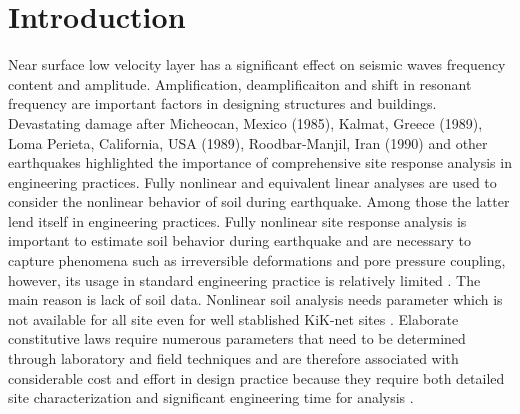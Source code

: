 
\section{Introduction}

Near surface low velocity layer has a significant effect on seismic waves frequency content and amplitude. Amplification, deamplificaiton and shift in resonant frequency are important factors in designing structures and buildings. Devastating damage after Micheocan, Mexico (1985), Kalmat, Greece (1989), Loma Perieta, California, USA (1989), Roodbar-Manjil, Iran (1990) and other earthquakes highlighted the importance of comprehensive site response analysis in engineering practices. Fully nonlinear and equivalent linear analyses are used to consider the nonlinear behavior of soil during earthquake. Among those the latter lend itself in engineering practices. Fully nonlinear site response analysis is important to estimate soil behavior during earthquake and are necessary to capture phenomena such as irreversible deformations and pore pressure coupling, however, its usage in standard engineering practice is relatively limited \citep{Assimaki2008quantifying}. The main reason is lack of soil data.  Nonlinear soil analysis needs parameter which is not available for all site even for well stablished KiK-net sites \citep{Kaklamanos2013critical}. Elaborate constitutive laws require numerous parameters that need to be determined through laboratory and  field techniques and are therefore associated with considerable cost and effort in design practice because they require both detailed site characterization and significant engineering time for analysis \citep{Assimaki2008quantifying}.

